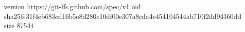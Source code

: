 version https://git-lfs.github.com/spec/v1
oid sha256:31f4eb683cd16b5e8d280e10df00e307a8cda4e454104544ab710f2dd94360dd
size 87544
